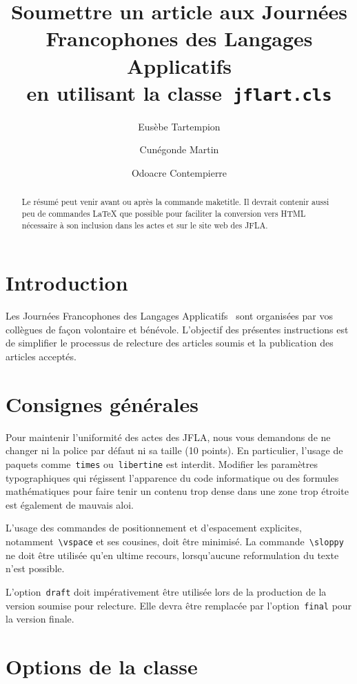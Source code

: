 \documentclass{jflart}
\title{Soumettre un article aux Journées Francophones des Langages Applicatifs\\
  en utilisant la classe~\texttt{jflart.cls}}
\author[1]{Eusèbe Tartempion}
\author[2]{Cunégonde Martin}
\author[2]{Odoacre Contempierre}
\affil[1]{Université Paris Université, CNRS, INRIA, CEA, INRA, INSERM, Paris, 75013, France}
\affil[2]{Université Sorbonne Très Grand Sud, Nice, 06000, France}
\newcommand{\cmd}[1]{\texttt{\textbackslash {#1}}}
\begin{document}
\maketitle

\begin{abstract}
  Le résumé peut venir avant ou après la commande maketitle.
  Il devrait contenir aussi peu de commandes LaTeX que possible pour faciliter
  la conversion vers HTML nécessaire à son inclusion dans les actes et sur le
  site web des JFLA.
\end{abstract}

\section{Introduction}

Les Journées Francophones des Langages Applicatifs~\cite{JFLA} sont organisées
par vos collègues de façon volontaire et bénévole.
%
L'objectif des présentes instructions est de simplifier le processus de
relecture des articles soumis et la publication des articles acceptés.

\section{Consignes générales}

Pour maintenir l'uniformité des actes des JFLA, nous vous demandons de ne
changer ni la police par défaut ni sa taille (10 points).
%
En particulier, l'usage de paquets comme~\texttt{times} ou~\texttt{libertine}
est interdit.
%
Modifier les paramètres typographiques qui régissent l'apparence du code
informatique ou des formules mathématiques pour faire tenir un contenu trop
dense dans une zone trop étroite est également de mauvais aloi.

L'usage des commandes de positionnement et d'espacement explicites,
notamment~\cmd{vspace} et ses cousines, doit être minimisé.
%
La commande~\cmd{sloppy} ne doit être utilisée qu'en ultime recours,
lorsqu'aucune reformulation du texte n'est possible.

L'option~\texttt{draft} doit impérativement être utilisée lors de la production
de la version soumise pour relecture.
%
Elle devra être remplacée par l'option~\texttt{final} pour la version finale.

\section{Options de la classe}
\end{document}
